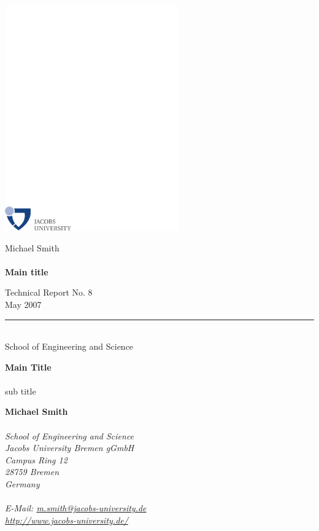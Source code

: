 \documentclass[12pt,a4paper]{article}
\begin{document}
\thispagestyle{empty}
{\vspace*{-2.8cm} \hspace*{7.5cm} \includegraphics[width=75mm,viewport=0 0 235 85,clip]{Jacobs_LOGO_4C.pdf}}
\vspace{6.5cm}

{\noindent \large \textsf{Michael Smith}} \\
\\

{\noindent \LARGE \bf \textsf{Main title}} \\
\vfill

{\noindent \LARGE \textsf{Technical Report No. 8}} \\
{\noindent \textsf{May 2007}} \\
{\hspace*{-3.17cm} \rule[3mm]{\textwidth}{0.75pt}} \\
{\LARGE \textsf{School of Engineering and Science}} \\



\newpage
\thispagestyle{empty}

{ 
\noindent
\huge {\bf Main Title} \\
\\
\Large{sub title}\\
\normalsize

\vspace{1cm}

\noindent
{\bf Michael Smith}\\
\\
{\it 
School of Engineering and Science\\
Jacobs University Bremen gGmbH\\
Campus Ring 12\\
28759 Bremen\\
Germany\\ 
\\
E-Mail: \href{mailto:m.smith@jacobs-university.de}{m.smith@jacobs-university.de}\\
\url{http://www.jacobs-university.de/} 
} \\


}
\end{document}
